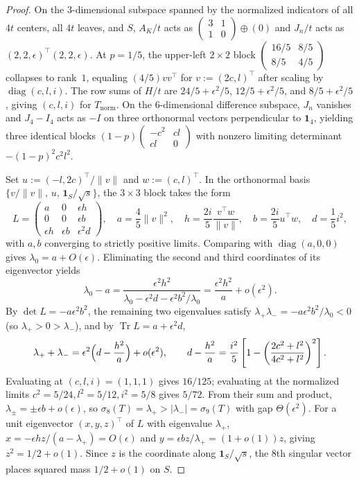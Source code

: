 \documentclass[11pt]{article}
\theoremstyle{plain}
\theoremstyle{definition}
\theoremstyle{remark}
\DeclareMathOperator{\diag}{diag}
\DeclareMathOperator{\Tr}{Tr}
\begin{document}
\begin{proof}
On the $3$-dimensional subspace spanned by the normalized indicators of all $4t$ centers, all $4t$ leaves, and $S$, $A_K/t$ acts as $\begin{pmatrix} 3 & 1 \\ 1 & 0 \end{pmatrix} \oplus (0)$ and $J_n/t$ acts as $(2, 2, \epsilon)^\top(2, 2, \epsilon)$. At $p = 1/5$, the upper-left $2 \times 2$ block $\begin{pmatrix} 16/5 & 8/5 \\ 8/5 & 4/5 \end{pmatrix}$ collapses to rank~$1$, equaling $(4/5)vv^\top$ for $v := (2c, l)^\top$ after scaling by $\diag(c, l, i)$. The row sums of $H/t$ are $24/5 + \epsilon^2/5$, $12/5 + \epsilon^2/5$, and $8/5 + \epsilon^2/5$, giving $(c, l, i)$ for $T_{\mathrm{norm}}$. On the $6$-dimensional difference subspace, $J_n$ vanishes and $J_4 - I_4$ acts as $-I$ on three orthonormal vectors perpendicular to $\mathbf{1}_4$, yielding three identical blocks $(1-p)\begin{pmatrix} -c^2 & cl \\ cl & 0 \end{pmatrix}$ with nonzero limiting determinant $-(1-p)^2 c^2 l^2$.

Set $u := (-l, 2c)^\top/\|v\|$ and $w := (c, l)^\top$. In the orthonormal basis $\{v/\|v\|,\, u,\, \mathbf{1}_S/\sqrt{s}\}$, the $3 \times 3$ block takes the form
\[
L = \begin{pmatrix}
a & 0 & \epsilon h \\
0 & 0 & \epsilon b \\
\epsilon h & \epsilon b & \epsilon^2 d
\end{pmatrix},
\quad
a = \frac{4}{5}\|v\|^2, \quad h = \frac{2i}{5}\frac{v^\top w}{\|v\|}, \quad b = \frac{2i}{5} u^\top w, \quad d = \frac{1}{5}i^2,
\]
with $a, b$ converging to strictly positive limits. Comparing with $\diag(a, 0, 0)$ gives $\lambda_0 = a + O(\epsilon)$. Eliminating the second and third coordinates of its eigenvector yields
\[
\lambda_0 - a = \frac{\epsilon^2 h^2}{\lambda_0 - \epsilon^2 d - \epsilon^2 b^2/\lambda_0} = \frac{\epsilon^2 h^2}{a} + o(\epsilon^2).
\]
By $\det L = -a\epsilon^2 b^2$, the remaining two eigenvalues satisfy $\lambda_+ \lambda_- = -a\epsilon^2 b^2/\lambda_0 < 0$ (so $\lambda_+ > 0 > \lambda_-$), and by $\Tr L = a + \epsilon^2 d$,
\[
\lambda_+ + \lambda_- = \epsilon^2\Bigl(d - \frac{h^2}{a}\Bigr) + o(\epsilon^2), \qquad
d - \frac{h^2}{a} = \frac{i^2}{5}\left[1 - \left(\frac{2c^2 + l^2}{4c^2 + l^2}\right)^2\right].
\]
Evaluating at $(c, l, i) = (1, 1, 1)$ gives $16/125$; evaluating at the normalized limits $c^2 = 5/24, l^2 = 5/12, i^2 = 5/8$ gives $5/72$. From their sum and product, $\lambda_\pm = \pm\epsilon b + o(\epsilon)$, so $\sigma_8(T) = \lambda_+ > |\lambda_-| = \sigma_9(T)$ with gap $\Theta(\epsilon^2)$. For a unit eigenvector $(x, y, z)^\top$ of $L$ with eigenvalue $\lambda_+$, $x = -\epsilon h z/(a - \lambda_+) = O(\epsilon)$ and $y = \epsilon b z / \lambda_+ = (1 + o(1))z$, giving $z^2 = 1/2 + o(1)$. Since $z$ is the coordinate along $\mathbf{1}_S/\sqrt{s}$, the $8$th singular vector places squared mass $1/2 + o(1)$ on $S$.
\end{proof}
\end{document}
